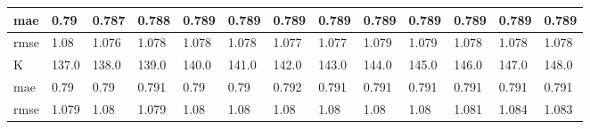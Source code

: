 \begin{appendices}
\begin{center}
\begin{tabularx}{\textwidth}{|l|X|X|X|X|X|X|X|X|X|X|X|X|}
		mae & 0.79 & 0.787 & 0.788 & 0.789 & 0.789 & 0.789 & 0.789 & 0.789 & 0.789 & 0.789 & 0.789 & 0.789 \\ \hline 
		rmse & 1.08 & 1.076 & 1.078 & 1.078 & 1.078 & 1.077 & 1.077 & 1.079 & 1.079 & 1.078 & 1.078 & 1.078 \\ \hline 
		\hline 
		K & 137.0 & 138.0 & 139.0 & 140.0 & 141.0 & 142.0 & 143.0 & 144.0 & 145.0 & 146.0 & 147.0 & 148.0 \\ \hline 
		mae & 0.79 & 0.79 & 0.791 & 0.79 & 0.79 & 0.792 & 0.791 & 0.791 & 0.791 & 0.791 & 0.791 & 0.791 \\ \hline 
		rmse & 1.079 & 1.08 & 1.079 & 1.08 & 1.08 & 1.08 & 1.08 & 1.08 & 1.08 & 1.081 & 1.084 & 1.083 \\ \hline 
	\end{tabularx} 
\end{center}


\end{appendices}
